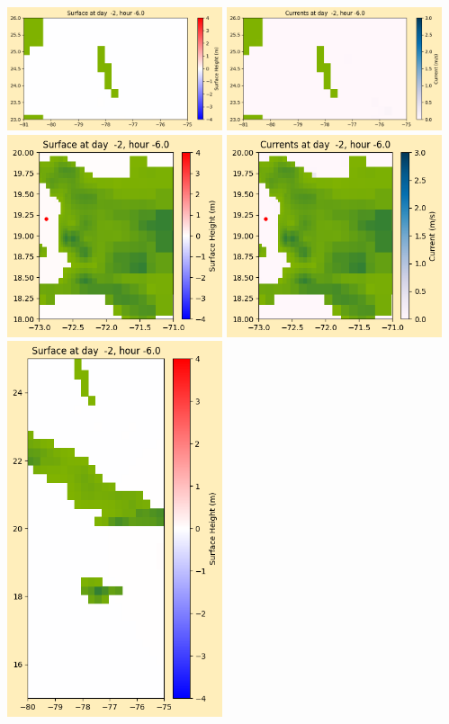 \documentclass[11pt]{article}
\begin{document}
\vskip 10pt 
\includegraphics[width=0.475\textwidth]{frame0003fig1003.png}
\includegraphics[width=0.475\textwidth]{frame0003fig1004.png}
\vskip 10pt 
\includegraphics[width=0.475\textwidth]{frame0003fig1005.png}
\includegraphics[width=0.475\textwidth]{frame0003fig1006.png}
\vskip 10pt 
\includegraphics[width=0.475\textwidth]{frame0003fig1007.png}
\end{document}
